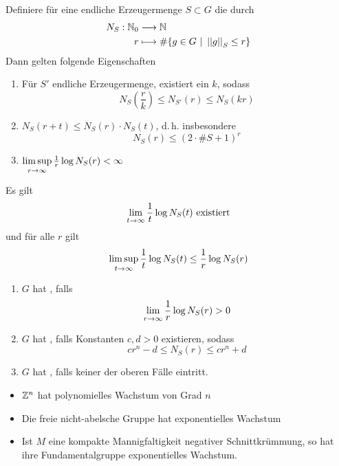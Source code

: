 \documentclass{book}
\begin{document}
\Def{}
Definiere für eine endliche Erzeugermenge $S \subset G$ die  durch
\begin{align*}
N_S : \mathbb{N}_0 &\overset{}{\longrightarrow} \mathbb{N}\\
r &\longmapsto \# \{g \in G~|~\left|\left|g\right|\right|_S \leq r\}
\end{align*}
Dann gelten folgende Eigenschaften
\begin{enumerate}[1.)]
\item Für $S'$ endliche Erzeugermenge, existiert ein $k$, sodass
\[ N_S(\frac{r}{k}) \leq N_{S'}(r) \leq N_S(kr) \]
\item $N_S(r +t) \leq N_S(r) \cdot N_S(t)$, d.\,h. insbesondere
\[ N_S(r) \leq (2\cdot \# S +1)^r \]
\item $\limsup\limits_{r\overset{}{\rightarrow}{\infty}} \frac{1}{r}\log N_S(r) < \infty $
\end{enumerate}

\Lem{}
Es gilt
\[ \lim\limits_{t\overset{}{\rightarrow} \infty} \frac{1}{t} \log N_S(t) \text{ existiert} \]
und für alle $r$ gilt
\[ \limsup\limits_{t\overset{}{\rightarrow}{\infty}} \frac{1}{t}\log N_S(t) \leq \frac{1}{r}\log N_S(r) \]

\Def{}
\begin{enumerate}[1.)]
\item $G$ hat , falls
\[ \lim\limits_{r\overset{}{\rightarrow} \infty} \frac{1}{r} \log N_S(r) > 0 \]
\item $G$ hat , falls Konstanten $c,d > 0$ existieren, sodass
\[ cr^n - d \leq N_S(r) \leq cr^n + d\]
\item $G$ hat , falls keiner der oberen Fälle eintritt.
\end{enumerate}

\Bsp{}
\begin{itemize}
\item $\mathbb{Z}^n$ hat polynomielles Wachstum von Grad $n$
\item Die freie nicht-abelsche Gruppe hat exponentielles Wachstum
\item Ist $M$ eine kompakte Mannigfaltigkeit negativer Schnittkrümmung, so hat ihre Fundamentalgruppe exponentielles Wachstum.
\end{itemize}
\end{document}
